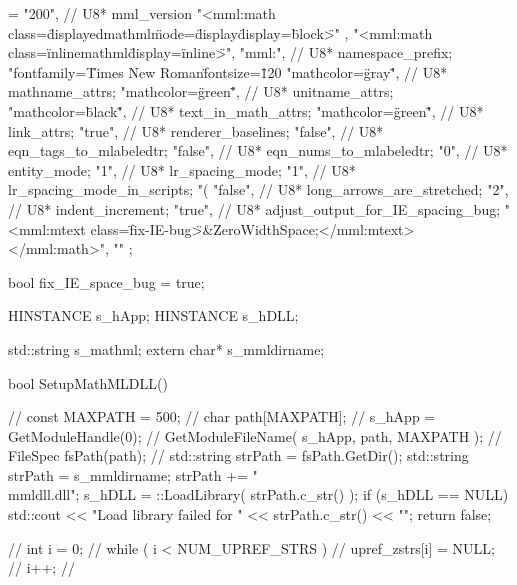 {{{{{{{{{{\fwbeginmacro
{}\fwplusequals \fwodef \fwbtx[const int NUM_UPREF_STRS = 20;
const int FIX_IE_BUG = 18;

char *upref_zstrs[] = {
  "200",                           // U8* mml_version
  "<mml:math class=\"displayedmathml\" mode=\"display\" display=\"block\">" ,
  "<mml:math class=\"inlinemathml\" display=\"inline\">",
  "mml:",                         //  U8* namespace_prefix;
  "fontfamily=\"Times New Roman\" fontsize=\"120%
  "mathcolor=\"gray\"",           //  U8* mathname_attrs;
  "mathcolor=\"green\"",          //  U8* unitname_attrs;
  "mathcolor=\"black\"",          //  U8* text_in_math_attrs;
  "mathcolor=\"green\"",          //  U8* link_attrs;
  "true",                         //  U8* renderer_baselines;
  "false",                        //  U8* eqn_tags_to_mlabeledtr;
  "false",                        //  U8* eqn_nums_to_mlabeledtr;
  "0",                            //  U8* entity_mode;
  "1",                            //  U8* lr_spacing_mode;
  "1",                            //  U8* lr_spacing_mode_in_scripts;
  "(%
  "false",                        //  U8* long_arrows_are_stretched;
  "2",                            //  U8* indent_increment;
  "true",                         //  U8* adjust_output_for_IE_spacing_bug;
  "<mml:mtext class=\"fix-IE-bug\">&ZeroWidthSpace;</mml:mtext></mml:math>",
  ""
};



bool fix_IE_space_bug =  true;

HINSTANCE s_hApp;
HINSTANCE s_hDLL;

std::string s_mathml;
extern char* s_mmldirname;

bool SetupMathMLDLL()
{
    // const MAXPATH = 500;
    // char path[MAXPATH];
    // s_hApp = GetModuleHandle(0);
    // GetModuleFileName( s_hApp, path, MAXPATH );
    // FileSpec fsPath(path);
    // std::string strPath = fsPath.GetDir();
    std::string strPath = s_mmldirname;
    strPath += "\\mmldll.dll";
    s_hDLL = ::LoadLibrary( strPath.c_str() );
    if (s_hDLL == NULL) {
      std::cout << "Load library failed for " << strPath.c_str() << "\n";
      return false;
    }

    // int i = 0;
    // while ( i < NUM_UPREF_STRS ) {
    //   upref_zstrs[i]  =  NULL;
    //   i++;
    // }

}}}}}}}}}}}
